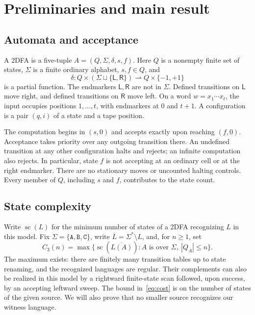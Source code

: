 \documentclass[11pt,a4paper]{article}
\theoremstyle{definition}
\theoremstyle{remark}
\newcommand{\LL}{\mathsf L}
\newcommand{\RR}{\mathsf R}
\newcommand{\statecomplexity}{\operatorname{sc}}
\begin{document}
\section{Preliminaries and main result}\label{sec:model}

\subsection{Automata and acceptance}

A 2DFA is a five-tuple $A=(Q,\Sigma,\delta,s,f)$. Here $Q$ is a
nonempty finite set of states, $\Sigma$ is a finite ordinary alphabet,
$s,f\in Q$, and
\[
 \delta:Q\times(\Sigma\sqcup\{\LL,\RR\})
       \rightharpoonup Q\times\{-1,+1\}
\]
is a partial function. The endmarkers $\LL,\RR$ are not in $\Sigma$.
Defined transitions on $\LL$ move right, and defined transitions on
$\RR$ move left. On a word $w=x_1\cdots x_t$, the input occupies
positions $1,\ldots,t$, with endmarkers at $0$ and $t+1$. A
configuration is a pair $(q,i)$ of a state and a tape position.

The computation begins in $(s,0)$ and accepts exactly upon reaching
$(f,0)$. Acceptance takes priority over any outgoing transition there.
An undefined transition at any other configuration halts and rejects;
an infinite computation also rejects. In particular, state $f$ is not
accepting at an ordinary cell or at the right endmarker. There are no
stationary moves or uncounted halting controls. Every member of $Q$,
including $s$ and $f$, contributes to the state count.

\subsection{State complexity}

Write $\statecomplexity(L)$ for the minimum number of states of a 2DFA
recognizing $L$ in this model. Fix
$\Sigma=\{\mathtt A,\mathtt B,\mathtt C\}$, write
$\overline L=\Sigma^*\setminus L$, and, for $n\ge1$, set
\begin{equation}\label{eq:cost}
 C_3(n)=\max\{\statecomplexity(\overline{L(A)}):
                 A\text{ is over }\Sigma,\ |Q_A|\le n\}.
\end{equation}
The maximum exists: there are finitely many transition tables up to
state renaming, and the recognized languages are regular. Their
complements can also be realized in this model by a rightward
finite-state scan followed, upon success, by an accepting leftward
sweep. The bound in~\eqref{eq:cost} is on the number of states of the given
source. We will also prove that no smaller source recognizes our
witness language.
\end{document}
